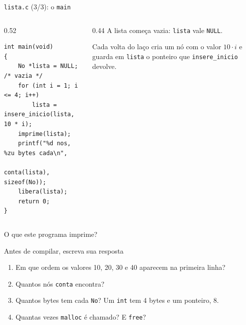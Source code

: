 \documentclass[aspectratio=169]{beamer}
\begin{document}
\begin{frame}[fragile]{\texttt{lista.c} (3/3): o \texttt{main}}
  \begin{columns}[c]
    \begin{column}{0.52\textwidth}
\begin{lstlisting}[style=codC]
int main(void)
{
    No *lista = NULL;          /* vazia */
    for (int i = 1; i <= 4; i++)
        lista = insere_inicio(lista, 10 * i);
    imprime(lista);
    printf("%d nos, %zu bytes cada\n",
           conta(lista), sizeof(No));
    libera(lista);
    return 0;
}
\end{lstlisting}
    \end{column}
    \begin{column}{0.44\textwidth}
      \small
      A lista começa vazia: \texttt{lista} vale \texttt{NULL}.

      \medskip
      Cada volta do laço cria um nó com o valor $10 \cdot i$ e guarda em
      \texttt{lista} o ponteiro que \texttt{insere\_inicio} devolve.
    \end{column}
  \end{columns}
\end{frame}

\begin{frame}{O que este programa imprime?}
  \begin{block}{Antes de compilar, escreva sua resposta}
    \begin{enumerate}
      \item Em que ordem os valores 10, 20, 30 e 40 aparecem na primeira
        linha?
      \item Quantos nós \texttt{conta} encontra?
      \item Quantos bytes tem cada \texttt{No}? Um \texttt{int} tem 4 bytes
        e um ponteiro, 8.
      \item Quantas vezes \texttt{malloc} é chamado? E \texttt{free}?
    \end{enumerate}
  \end{block}
\end{frame}
\end{document}

